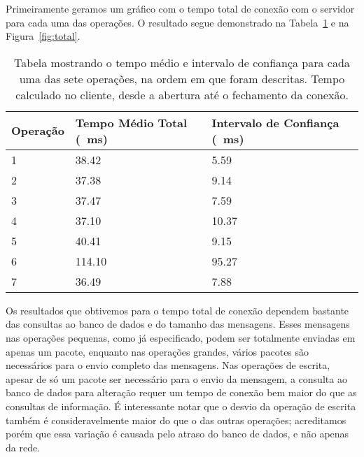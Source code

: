 \documentclass[12pt,a4paper]{article}
\begin{document}
Primeiramente geramos um gráfico com o tempo total de conexão com o servidor para cada uma das operações. O resultado segue demonstrado na Tabela~\ref{table:total} e na Figura~\ref{fig:total}.

\begin{table}[h]
\centering
\caption{Tabela mostrando o tempo médio e intervalo de confiança para cada uma das sete operações, na ordem em que foram descritas. Tempo calculado no cliente, desde a abertura até o fechamento da conexão.}
\label{table:total}
\begin{tabular}{lll}
Operação & Tempo Médio Total (\SI{}{\milli\second}) & Intervalo de Confiança (\SI{}{\milli\second})\\ \hline
1        & 38.42           & 5.59   \\
2        & 37.38           & 9.14   \\
3        & 37.47           & 7.59   \\
4        & 37.10           & 10.37  \\
5        & 40.41           & 9.15   \\
6        & 114.10          & 95.27  \\
7        & 36.49           & 7.88  
\end{tabular}
\end{table}


Os resultados que obtivemos para o tempo total de conexão dependem bastante das consultas ao banco de dados e do tamanho das mensagens. Esses mensagens nas operações pequenas, como já especificado, podem ser totalmente enviadas em apenas um pacote, enquanto nas operações grandes, vários pacotes são necessários para o envio completo das mensagens. Nas operações de escrita, apesar de só um pacote ser necessário para o envio da mensagem, a consulta ao banco de dados para alteração requer um tempo de conexão bem maior do que as consultas de informação. É interessante notar que o desvio da operação de escrita também é consideravelmente maior do que o das outras operações; acreditamos porém que essa variação é causada pelo atraso do banco de dados, e não apenas da rede.
\end{document}
